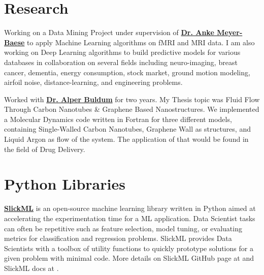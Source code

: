 \documentclass[]{template}
\begin{document}
\section{Research}
\sectionsep
{}
Working on a Data Mining Project under supervision of  \textbf{\href{https://people.sc.fsu.edu/~ameyerbaese/}{Dr. Anke Meyer-Baese}} to apply Machine Learning algorithms on fMRI and MRI data. I am also working on Deep Learning algorithms to build predictive models for various databases in collaboration on several fields including neuro-imaging, breast cancer, dementia, energy consumption, stock market, ground motion modeling, airfoil noise, distance-learning, and engineering problems.

\sectionsep

Worked with \textbf{\href{https://www.uakron.edu/physics/faculty-staff/bio-detail.dot?u=buldum}{Dr. Alper Buldum}} for two years. My Thesis topic was Fluid Flow Through Carbon Nanotubes \& Graphene Based Nanostructures. We implemented a Molecular Dynamics code written in Fortran for three different models, containing Single-Walled Carbon Nanotubes, Graphene Wall as structures, and Liquid Argon as flow of the system. The application of that would be found in the field of Drug Delivery.
\sectionsep
\hline
\sectionsep
\section{Python Libraries}
\sectionsep
{}
\textbf{\href{https://github.com/slickml/slick-ml}{SlickML}} is an open-source machine learning library written in Python aimed at accelerating the experimentation time for a ML application. Data Scientist tasks can often be repetitive such as feature selection, model tuning, or evaluating metrics for classification and regression problems. SlickML provides Data Scientists with a toolbox of utility functions to quickly prototype solutions for a given problem with minimal code. More details on SlickML GitHub page at  and SlickML docs at .


\sectionsep
\hline
\sectionsep
\end{document}
